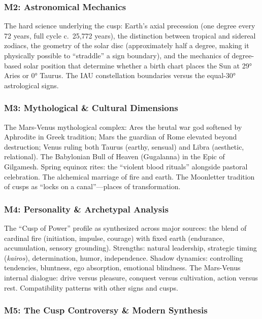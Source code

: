 \documentclass[11pt,letterpaper]{article}
\begin{document}
\subsubsection{M2: Astronomical Mechanics}

The hard science underlying the cusp: Earth's axial precession (one degree every 72 years, full cycle c.\ 25,772 years), the distinction between tropical and sidereal zodiacs, the geometry of the solar disc (approximately half a degree, making it physically possible to ``straddle'' a sign boundary), and the mechanics of degree-based solar position that determine whether a birth chart places the Sun at 29° Aries or 0° Taurus. The IAU constellation boundaries versus the equal-30° astrological signs.

\subsubsection{M3: Mythological \& Cultural Dimensions}

The Mars-Venus mythological complex: Ares the brutal war god softened by Aphrodite in Greek tradition; Mars the guardian of Rome elevated beyond destruction; Venus ruling both Taurus (earthy, sensual) and Libra (aesthetic, relational). The Babylonian Bull of Heaven (Gugalanna) in the Epic of Gilgamesh. Spring equinox rites: the ``violent blood rituals'' alongside pastoral celebration. The alchemical marriage of fire and earth. The Moonletter tradition of cusps as ``locks on a canal''---places of transformation.

\subsubsection{M4: Personality \& Archetypal Analysis}

The ``Cusp of Power'' profile as synthesized across major sources: the blend of cardinal fire (initiation, impulse, courage) with fixed earth (endurance, accumulation, sensory grounding). Strengths: natural leadership, strategic timing (\textit{kairos}), determination, humor, independence. Shadow dynamics: controlling tendencies, bluntness, ego absorption, emotional blindness. The Mars-Venus internal dialogue: drive versus pleasure, conquest versus cultivation, action versus rest. Compatibility patterns with other signs and cusps.

\subsubsection{M5: The Cusp Controversy \& Modern Synthesis}
\end{document}
